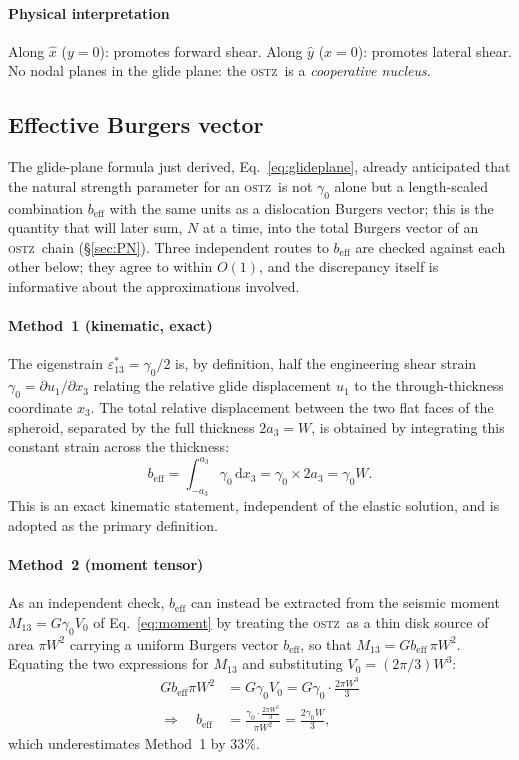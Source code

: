\documentclass[3p]{elsarticle}
\newcommand{\OSTZ}{\textsc{ostz}}
\newcommand{\gz}{\gamma_0}
\newcommand{\beff}{b_\mathrm{eff}}
\begin{document}
\paragraph{Physical interpretation}
Along $\hat x$ ($y=0$): promotes forward shear.
Along $\hat y$ ($x=0$): promotes lateral shear.
No nodal planes in the glide plane: the \OSTZ\ is a
\emph{cooperative nucleus}.

\subsection{Effective Burgers vector}
\label{sec:beff}

The glide-plane formula just derived, Eq.~\eqref{eq:glideplane},
already anticipated that the natural strength parameter for an
\OSTZ\ is not $\gz$ alone but a length-scaled combination $\beff$
with the same units as a dislocation Burgers vector; this is the
quantity that will later sum, $N$ at a time, into the total Burgers
vector of an \OSTZ\ chain (\S\ref{sec:PN}). Three independent routes
to $\beff$ are checked against each other below; they agree to
within $O(1)$, and the discrepancy itself is informative about the
approximations involved.

\paragraph{Method~1 (kinematic, exact)} The eigenstrain
$\varepsilon^*_{13}=\gz/2$ is, by definition, half the engineering
shear strain $\gz=\partial u_1/\partial x_3$ relating the relative
glide displacement $u_1$ to the through-thickness coordinate $x_3$.
The total relative displacement between the two flat faces of the
spheroid, separated by the full thickness $2a_3=W$, is obtained by
integrating this constant strain across the thickness:
\[
  \beff=\int_{-a_3}^{a_3}\gz\,\mathrm dx_3=\gz\times2a_3=\gz W.
\]
This is an exact kinematic statement, independent of the elastic
solution, and is adopted as the primary definition.

\paragraph{Method~2 (moment tensor)} As an independent check, $\beff$
can instead be extracted from the seismic moment $M_{13}=G\gz V_0$
of Eq.~\eqref{eq:moment} by treating the \OSTZ\ as a thin disk source
of area $\pi W^2$ carrying a uniform Burgers vector $\beff$, so that
$M_{13}=G\beff\,\pi W^2$. Equating the two expressions for $M_{13}$
and substituting $V_0=(2\pi/3)W^3$:
\begin{align*}
  G\beff\pi W^2&=G\gz V_0=G\gz\cdot\frac{2\pi W^3}{3}\\
  \Rightarrow\quad\beff&=\frac{\gz\cdot\frac{2\pi W^3}{3}}{\pi W^2}=\frac{2\gz W}{3},
\end{align*}
which underestimates Method~1 by 33\%.
\end{document}
